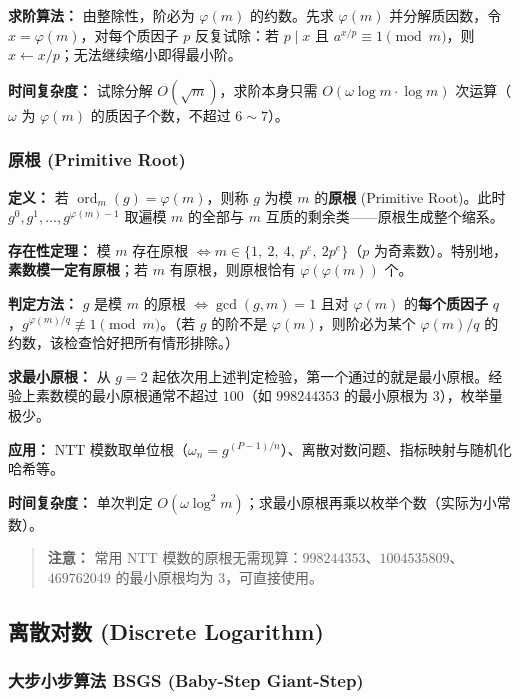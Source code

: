 \textbf{求阶算法：} 由整除性，阶必为 $\varphi(m)$ 的约数。先求 $\varphi(m)$ 并分解质因数，令 $x = \varphi(m)$，对每个质因子 $p$ 反复试除：若 $p \mid x$ 且 $a^{x/p} \equiv 1 \pmod{m}$，则 $x \gets x/p$；无法继续缩小即得最小阶。

\textbf{时间复杂度：} 试除分解 $O(\sqrt{m})$，求阶本身只需 $O(\omega \log m \cdot \log m)$ 次运算（$\omega$ 为 $\varphi(m)$ 的质因子个数，不超过 $6 \sim 7$）。

\subsubsection{原根 (Primitive Root)}

\textbf{定义：} 若 $\operatorname{ord}_m(g) = \varphi(m)$，则称 $g$ 为模 $m$ 的\textbf{原根} (Primitive Root)。此时 $g^0, g^1, \dots, g^{\varphi(m)-1}$ 取遍模 $m$ 的全部与 $m$ 互质的剩余类——原根生成整个缩系。

\textbf{存在性定理：} 模 $m$ 存在原根 $\iff m \in \{1,\ 2,\ 4,\ p^{e},\ 2p^{e}\}$（$p$ 为奇素数）。特别地，\textbf{素数模一定有原根}；若 $m$ 有原根，则原根恰有 $\varphi(\varphi(m))$ 个。

\textbf{判定方法：} $g$ 是模 $m$ 的原根 $\iff \gcd(g, m) = 1$ 且对 $\varphi(m)$ 的\textbf{每个质因子} $q$，$g^{\varphi(m)/q} \not\equiv 1 \pmod{m}$。（若 $g$ 的阶不是 $\varphi(m)$，则阶必为某个 $\varphi(m)/q$ 的约数，该检查恰好把所有情形排除。）

\textbf{求最小原根：} 从 $g = 2$ 起依次用上述判定检验，第一个通过的就是最小原根。经验上素数模的最小原根通常不超过 $100$（如 $998244353$ 的最小原根为 $3$），枚举量极少。

\textbf{应用：} NTT 模数取单位根（$\omega_n = g^{(P-1)/n}$）、离散对数问题、指标映射与随机化哈希等。

\textbf{时间复杂度：} 单次判定 $O(\omega \log^2 m)$；求最小原根再乘以枚举个数（实际为小常数）。



\begin{quote}
\textbf{注意：} 常用 NTT 模数的原根无需现算：$998244353$、$1004535809$、$469762049$ 的最小原根均为 $3$，可直接使用。
\end{quote}

\subsection{离散对数 (Discrete Logarithm)}

\subsubsection{大步小步算法 BSGS (Baby-Step Giant-Step)}

